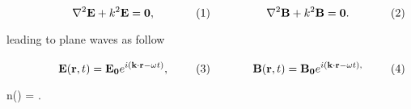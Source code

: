 	\begin{subequations}%
	\eqhalf{\nabla^2\vb{E} + k^2 \vb{E}=\vb{0},}%
	\eqhalf{\nabla^2\vb{B} + k^2 \vb{B}=\vb{0}.}\label{eq:Helmholtz}%
	\end{subequations}\vspace*{-1em}

\noindent leading to plane waves as follow

	\begin{subequations}%
	\eqhalf{\vb{E}(\vb{r},t) =\vb{E_0}e^{i(\vb{k}\cdot\vb{r} -\omega t)},}%
	\eqhalf{\vb{B}(\vb{r}, t) =\vb{B_0}e^{i(\vb{k}\cdot\vb{r} -\omega t),}}	
	\label{eqs:ondasPlanas}\end{subequations}\vspace*{-1em}
		
\noindent \blindtext \vspace*{-.75em}
%
	\begin{tcolorbox}[title = Índice de refracción, ams align]
	n(\omega) = .
		\label{eq:indice} 
	\end{tcolorbox}\vspace*{-.75em}

